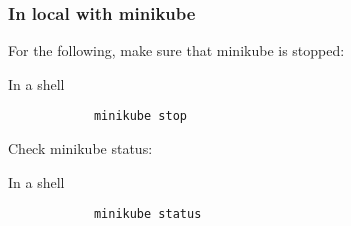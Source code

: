\begin{frame}[fragile]
	\frametitle{In local with minikube}
	
	For the following, make sure that minikube is stopped:
	\begin{block}{In a shell}
		\begin{verbatim}
			minikube stop
		\end{verbatim}
	\end{block}
	
	Check minikube status:
	\begin{block}{In a shell}
		\begin{verbatim}
			minikube status
		\end{verbatim}
	\end{block}
\end{frame}
